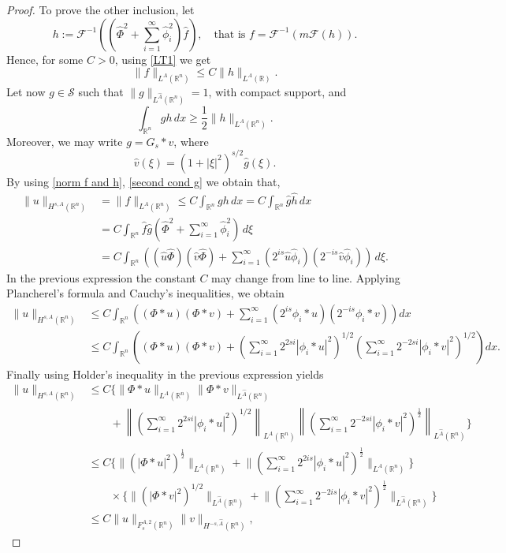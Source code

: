 \documentclass[leqno,twoside, 12pt]{amsart}
\theoremstyle{plain}
\numberwithin{equation}{section} \numberwithin{figure}{section}
\theoremstyle{definition}
\newcommand{\R}{\mathbb R}
\numberwithin{equation}{section}
\begin{document}
\begin{proof}
To prove the other inclusion, let
$$h:=\mathcal{F}^{-1}\left((\hat \Phi^2 + \sum_{i=1}^\infty \hat \phi_i^2)\hat f \right), \quad \text{that is }f=\mathcal{F}^{-1}(m\mathcal{F}(h)).$$Hence, for some $C>0$, using \eqref{LT1} we get
\begin{equation}\label{norm f and h}
\|f\|_{L^A(\R^n)}\leq C\|h\|_{L^A(\R)}. 
\end{equation}Let now $g\in \mathcal{S}$ such that $\|g\|_{L^{\hat A}(\R^n)}=1$, with compact support, and
\begin{equation}\label{second cond g}
\int_{\R^n}gh\,dx \geq \dfrac{1}{2}\|h\|_{L^A(\R^n)}.
\end{equation}Moreover, we may write $g=G_s*v$, where
$$\hat v(\xi)=(1+|\xi|^2)^{s/2}\hat g(\xi).$$
By using \eqref{norm f and h}, \eqref{second cond g} we obtain that, 
\begin{align*}
\|u\|_{H^{s, A}(\R^n)}&=\|f\|_{L^A(\R^n)} \leq C\int_{\R^n}gh\,dx = C\int_{\R^n}\hat g \hat h \,dx\\& =		C\int_{\R^n}\hat f \hat g \left(\hat \Phi^2 + \sum_{i=1}^\infty \hat \phi_i^2\right)\,d\xi\\& = C\int_{\R^n}\left((\hat u \hat \Phi)(\hat v \hat \Phi)+\sum_{i=1}^\infty (2^{is}\hat u \hat \phi_i)(2^{-is}\hat v \hat \phi_i)\right)\,d\xi.
\end{align*}
In the previous expression the constant $C$ may change from line to line. Applying Plancherel's formula and Cauchy's inequalities, we obtain
\begin{equation*}
\begin{split}
\|u\|_{H^{s, A}(\R^n)}& \leq C\int_{\R^n}\left((\Phi * u)(\Phi * v)+\sum_{i=1}^\infty (2^{is}\phi_i* u )(2^{-is}\phi_i* v)\right)dx\\ & \leq C\int_{\R^n}\left((\Phi * u)(\Phi * v) +\left(\sum_{i=1}^\infty 2^{2si}|\phi_i*u|^2 \right)^{1/2}\left(\sum_{i=1}^\infty 2^{-2si}|\phi_i*v|^2 \right)^{1/2}\right)dx
.\end{split}
\end{equation*}
Finally using Holder's inequality in the previous expression yields
\begin{equation*}
\begin{split}
\|u\|_{H^{s, A}(\R^n)}& \leq  C\bigg\{\|\Phi*u\|_{L^A(\R^n)}\|\Phi*v\|_{L^{\hat A}(\R^n)}\\&\qquad+\left\|\left( \sum_{i=1}^\infty 2^{2si}|\phi_i*u|^2 \right)^{1/2}\right\|_{L^A(\R^n)}\left\|\left( \sum_{i=1}^\infty 2^{-2si}|\phi_i*v|^2 \right)^\frac12\right\|_{L^{\hat A}(\R^n)}\bigg\}\\& \leq C\bigg\{\|(|\Phi*u|^2)^\frac12\|_{L^A(\R^n)}+\bigg\|\left(\sum_{i=1}^\infty 2^{2is}|\phi_i*u|^2\right)^\frac12 \bigg\|_{L^A(\R^n)} \bigg\}\\& \qquad \times \bigg\{\|(|\Phi*v|^2)^{1/2}\|_{L^{\hat A}(\R^n)}+\bigg\|\left(\sum_{i=1}^\infty 2^{-2is}|\phi_i*v|^2\right)^\frac12 \bigg\|_{L^{\hat A}(\R^n)} \bigg\}\\& \leq C\|u\|_{F_s^{A, 2}(\R^n)}\|v\|_{H^{-s, \hat A}(\R^n)},

\end{split}
\end{equation*}
\end{proof}
\end{document}
